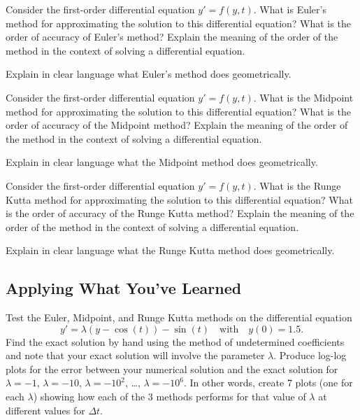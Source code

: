 \begin{problem}
    Consider the first-order differential equation $y' = f(y,t)$.  What is Euler's method
    for approximating the solution to this differential equation?  What is the order of
    accuracy of Euler's method?  Explain the meaning of the order of the method in the
    context of solving a differential equation.
\end{problem}

\begin{problem}
    Explain in clear language what Euler's method does geometrically.
\end{problem}

\begin{problem}
    Consider the first-order differential equation $y' = f(y,t)$.  What is the Midpoint method
    for approximating the solution to this differential equation?  What is the order of
    accuracy of the Midpoint method?  Explain the meaning of the order of the method in the
    context of solving a differential equation.
\end{problem}
\begin{problem}
    Explain in clear language what the Midpoint method does geometrically.
\end{problem}

\begin{problem}
    Consider the first-order differential equation $y' = f(y,t)$.  What is the Runge Kutta
    method for approximating the solution to this differential equation?  What is the
    order of accuracy of the Runge Kutta method?  Explain the meaning of the order of the
    method in the context of solving a differential equation.
\end{problem}

\begin{problem}
    Explain in clear language what the Runge Kutta method does geometrically.
\end{problem}

\subsection{Applying What You've Learned}
\begin{problem}
    Test the Euler, Midpoint, and Runge Kutta methods on the differential
    equation
    \[ y' = \lambda \left( y - \cos(t) \right) - \sin(t) \quad \text{with} \quad y(0) = 1.5. \]
    Find the exact solution by hand using the method of undetermined coefficients and note
    that your exact solution will involve the parameter $\lambda$.  Produce log-log plots
    for the error between your numerical solution and the exact solution for $\lambda =
    -1$, $\lambda = -10$, $\lambda = -10^2$, \ldots, $\lambda = -10^6$.  In other words,
    create 7 plots (one for each $\lambda$) showing how each of the 3 methods performs for
    that value of $\lambda$ at different values for $\Delta t$.
\end{problem}



